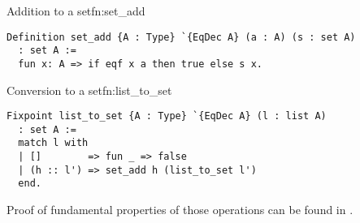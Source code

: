 \begin{func}{Addition to a set}{fn:set_add}
\begin{verbatim}
Definition set_add {A : Type} `{EqDec A} (a : A) (s : set A)  
  : set A :=
  fun x: A => if eqf x a then true else s x.
\end{verbatim}
\end{func}
\begin{func}{Conversion to a set}{fn:list_to_set}
\begin{verbatim}
Fixpoint list_to_set {A : Type} `{EqDec A} (l : list A) 
  : set A :=
  match l with
  | []        => fun _ => false
  | (h :: l') => set_add h (list_to_set l')
  end.
\end{verbatim}
\end{func}
Proof of fundamental properties of those operations can be found in .